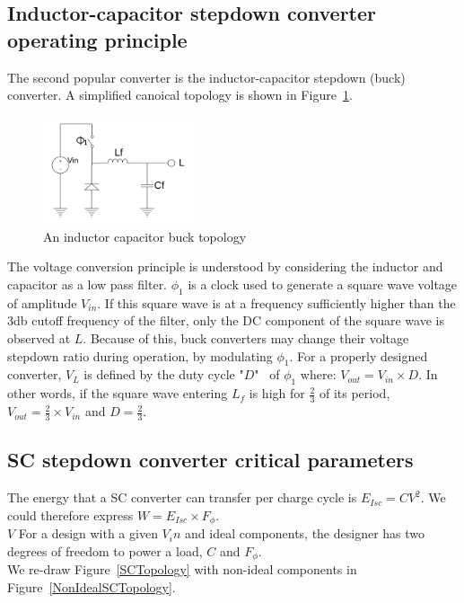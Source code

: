 \documentclass[letterpaper,twocolumn,10pt]{article}
\begin{document}
\subsection{Inductor-capacitor stepdown converter operating principle}

The second popular converter is the inductor-capacitor stepdown (buck) converter. A simplified canoical topology is shown in Figure~\ref{BKTopology}.\\
\begin{figure}[here]
\includegraphics[width=0.4\textwidth]{BKTopology}
\caption{An inductor capacitor buck topology}
\label{BKTopology}
\end{figure}

The voltage conversion principle is understood by considering the inductor and capacitor as a low pass filter. $\phi_1$ is a clock used to generate a square wave voltage of amplitude $V_{in}$. If this square wave is at a frequency sufficiently higher than the 3db cutoff frequency of the filter, only the DC component of the square wave is observed at $L$. Because of this, buck converters may change their voltage stepdown ratio during operation, by modulating $\phi_1$. For a properly designed converter, $V_L$ is defined by the duty cycle "$D$"~\cite{Kurson2006} of $\phi_1$ where: $V_{out} = V_{in} \times D$. In other words, if the square wave entering $L_f$ is high for $\frac{2}{3}$ of its period, $V_{out} = \frac{2}{3}\times V_{in}$ and $D = \frac{2}{3}$.\\ 

\subsection{SC stepdown converter critical parameters}
The energy that a SC converter can transfer per charge cycle is $E_{Isc} = CV^2$. We could therefore express $W = E_{Isc}\times F_\phi$.\\
$V$ For a design with a given $V_in$ and ideal components, the designer has two degrees of freedom to power a load, $C$ and $F_\phi$.\\  
We re-draw Figure~\ref{SCTopology} with non-ideal components in Figure~\ref{NonIdealSCTopology}.\\
\end{document}
